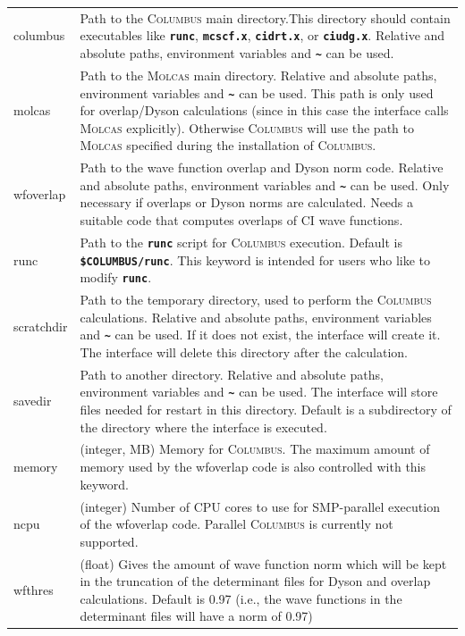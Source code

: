 \documentclass[a4paper,10pt,DIV=15,openany]{scrbook}
\newcommand{\ttt}[1]{\textbf{\texttt{#1}}}
\begin{document}
\begin{longtable}{>{\ttfamily}lp{12cm}}
columbus        &Path to the \textsc{Columbus} main directory.This directory should contain executables like \ttt{runc}, \ttt{mcscf.x}, \ttt{cidrt.x}, or \ttt{ciudg.x}. Relative and absolute paths, environment variables and \ttt{\textasciitilde} can be used.\\
molcas          &Path to the \textsc{Molcas} main directory.  Relative and absolute paths, environment variables and \ttt{\textasciitilde} can be used. This path is only used for overlap/Dyson calculations (since in this case the interface calls \textsc{Molcas} explicitly). Otherwise \textsc{Columbus} will use the path to \textsc{Molcas} specified during the installation of \textsc{Columbus}.\\
wfoverlap       &Path to the wave function overlap and Dyson norm code. Relative and absolute paths, environment variables and \ttt{\textasciitilde} can be used. Only necessary if overlaps or Dyson norms are calculated. Needs a suitable code that computes overlaps of CI wave functions.\\
runc            &Path to the \ttt{runc} script for \textsc{Columbus} execution. Default is \ttt{\$COLUMBUS/runc}. This keyword is intended for users who like to modify \ttt{runc}.\\
scratchdir      &Path to the temporary directory, used to perform the \textsc{Columbus} calculations. Relative and absolute paths, environment variables and \ttt{\textasciitilde} can be used. If it does not exist, the interface will create it. The interface will delete this directory after the calculation.\\
savedir         &Path to another directory.  Relative and absolute paths, environment variables and \ttt{\textasciitilde} can be used. The interface will store files needed for restart in this directory. Default is a subdirectory of the directory where the interface is executed.\\
memory          &(integer, MB) Memory for \textsc{Columbus}. The maximum amount of memory used by the wfoverlap code is also controlled with this keyword.\\
ncpu            &(integer) Number of CPU cores to use for SMP-parallel execution of the wfoverlap code. Parallel \textsc{Columbus} is currently not supported.\\
wfthres         &(float) Gives the amount of wave function norm which will be kept in the truncation of the determinant files for Dyson and overlap calculations. Default is 0.97 (i.e., the wave functions in the determinant files will have a norm of 0.97)\\

\end{longtable}
\end{document}
